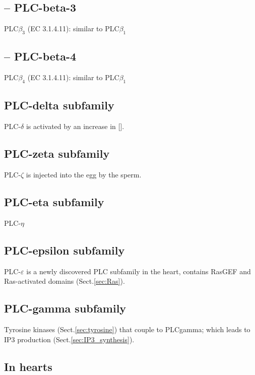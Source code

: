 \subsection{-- PLC-beta-3}

PLC$\beta_3$ (EC 3.1.4.11): similar to PLC$\beta_1$ 

\subsection{-- PLC-beta-4}

PLC$\beta_4$ (EC 3.1.4.11): similar to PLC$\beta_1$


\subsection{PLC-delta subfamily}
\label{sec:PLC-delta}

PLC-$\delta$ is activated by an increase in [].

\subsection{PLC-zeta subfamily}
\label{sec:PLC-zeta}


PLC-$\zeta$ is injected into the egg by the sperm.

\subsection{PLC-eta subfamily}
\label{sec:PLC-eta}


PLC-$\eta$

\subsection{PLC-epsilon subfamily}
\label{sec:PLC-epsilon}

PLC-$\varepsilon$ is a newly discovered PLC subfamily in the heart, contains
RasGEF and Ras-activated domains (Sect.\ref{sec:Ras}).
  

\subsection{PLC-gamma subfamily}
\label{sec:PLC-gamma}

Tyrosine kinases (Sect.\ref{sec:tyrosine}) that couple to PLCgamma; which leads
to IP3 production (Sect.\ref{sec:IP3_synthesis}).

\subsection{In hearts}

